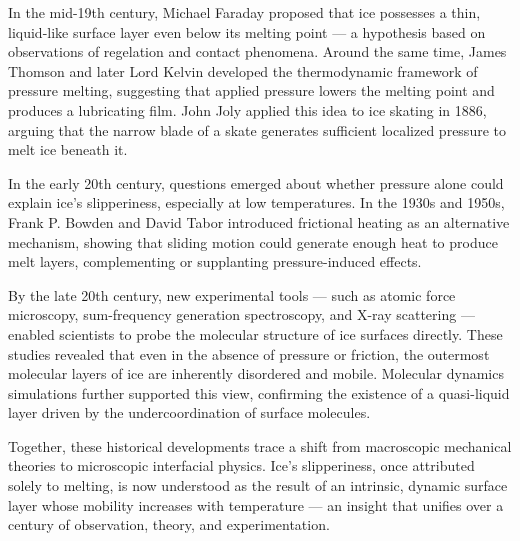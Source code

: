 \begin{historical}
In the mid-19th century, Michael Faraday proposed that ice possesses a thin, liquid-like surface layer even below its melting point — a hypothesis based on observations of regelation and contact phenomena. Around the same time, James Thomson and later Lord Kelvin developed the thermodynamic framework of pressure melting, suggesting that applied pressure lowers the melting point and produces a lubricating film. John Joly applied this idea to ice skating in 1886, arguing that the narrow blade of a skate generates sufficient localized pressure to melt ice beneath it.

In the early 20th century, questions emerged about whether pressure alone could explain ice's slipperiness, especially at low temperatures. In the 1930s and 1950s, Frank P. Bowden and David Tabor introduced frictional heating as an alternative mechanism, showing that sliding motion could generate enough heat to produce melt layers, complementing or supplanting pressure-induced effects.

By the late 20th century, new experimental tools — such as atomic force microscopy, sum-frequency generation spectroscopy, and X-ray scattering — enabled scientists to probe the molecular structure of ice surfaces directly. These studies revealed that even in the absence of pressure or friction, the outermost molecular layers of ice are inherently disordered and mobile. Molecular dynamics simulations further supported this view, confirming the existence of a quasi-liquid layer driven by the undercoordination of surface molecules.

Together, these historical developments trace a shift from macroscopic mechanical theories to microscopic interfacial physics. Ice’s slipperiness, once attributed solely to melting, is now understood as the result of an intrinsic, dynamic surface layer whose mobility increases with temperature — an insight that unifies over a century of observation, theory, and experimentation.
\end{historical}
